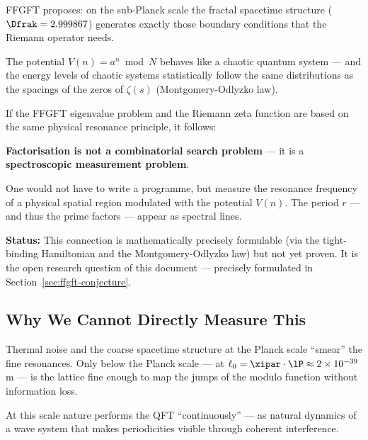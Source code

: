 FFGFT proposes:
on the sub-Planck scale the fractal
spacetime structure ($\Dfrak = 2.999867$)
generates exactly those boundary conditions that the
Riemann operator needs.

The potential $V(n) = a^n \bmod N$ behaves
like a chaotic quantum system ---
and the energy levels of chaotic systems
statistically follow the same distributions
as the spacings of the zeros of $\zeta(s)$
(Montgomery-Odlyzko law).

\begin{keyresult}
If the FFGFT eigenvalue problem and the
Riemann zeta function are based on the same
physical resonance principle, it follows:

\textbf{Factorisation is not a combinatorial
search problem} --- it is a
\textbf{spectroscopic measurement problem}.

One would not have to write a programme,
but measure the resonance frequency of a physical
spatial region modulated with the potential $V(n)$.
The period $r$ --- and thus the prime factors ---
appear as spectral lines.

\medskip
\textbf{Status:} This connection is
mathematically precisely formulable
(via the tight-binding Hamiltonian
and the Montgomery-Odlyzko law)
but not yet proven.
It is the open research question
of this document --- precisely formulated in
Section~\ref{sec:ffgft-conjecture}.
\end{keyresult}

\subsection{Why We Cannot Directly Measure This}

Thermal noise and the coarse spacetime structure
at the Planck scale ``smear'' the
fine resonances.
Only below the Planck scale ---
at $\ell_0 = \xipar \cdot \lP \approx 2 \times 10^{-39}$\,m ---
is the lattice fine enough to map the jumps
of the modulo function without information loss.

At this scale nature performs the QFT
``continuously'' --- as natural dynamics
of a wave system that makes periodicities
visible through coherent interference.

